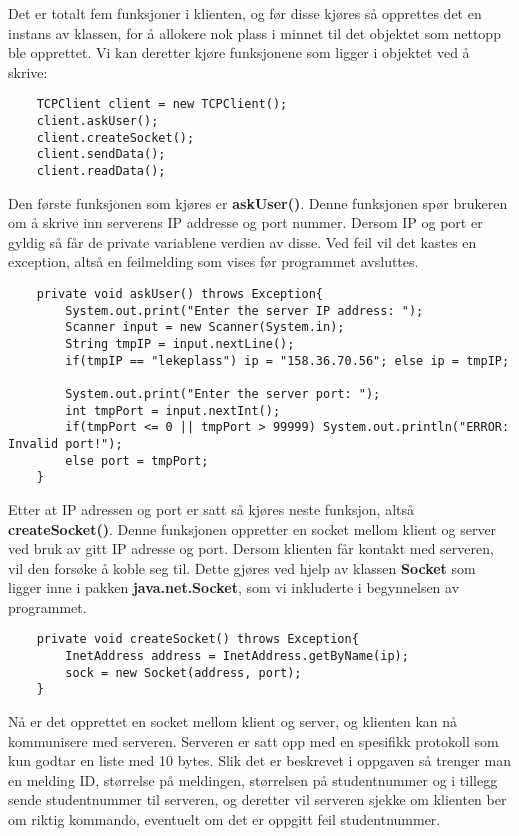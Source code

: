 Det er totalt fem funksjoner i klienten, og før disse kjøres så opprettes det en instans av klassen, for å allokere nok plass i minnet til det objektet som nettopp ble opprettet. Vi kan deretter kjøre funksjonene som ligger i objektet ved å skrive:
\begin{lstlisting}
	TCPClient client = new TCPClient();
	client.askUser();
	client.createSocket();
	client.sendData();
	client.readData();
\end{lstlisting}

Den første funksjonen som kjøres er \textbf{askUser()}. Denne funksjonen spør brukeren om å skrive inn serverens IP addresse og port nummer. Dersom IP og port er gyldig så får de private variablene verdien av disse. Ved feil vil det kastes en exception, altså en feilmelding som vises før programmet avsluttes.
\begin{lstlisting}
	private void askUser() throws Exception{
		System.out.print("Enter the server IP address: ");
		Scanner input = new Scanner(System.in);
		String tmpIP = input.nextLine();
		if(tmpIP == "lekeplass") ip = "158.36.70.56"; else ip = tmpIP;

		System.out.print("Enter the server port: ");
		int tmpPort = input.nextInt();
		if(tmpPort <= 0 || tmpPort > 99999) System.out.println("ERROR: Invalid port!");
		else port = tmpPort;
	}
\end{lstlisting}

Etter at IP adressen og port er satt så kjøres neste funksjon, altså \textbf{createSocket()}. Denne funksjonen oppretter en socket mellom klient og server ved bruk av gitt IP adresse og port. Dersom klienten får kontakt med serveren, vil den forsøke å koble seg til. Dette gjøres ved hjelp av klassen \textbf{Socket} som ligger inne i pakken \textbf{java.net.Socket}, som vi inkluderte i begynnelsen av programmet.
\begin{lstlisting}
	private void createSocket() throws Exception{
		InetAddress address = InetAddress.getByName(ip);
		sock = new Socket(address, port);
	}
\end{lstlisting}

Nå er det opprettet en socket mellom klient og server, og klienten kan nå kommunisere med serveren. Serveren er satt opp med en spesifikk protokoll som kun godtar en liste med 10 bytes. Slik det er beskrevet i oppgaven så trenger man en melding ID, størrelse på meldingen, størrelsen på studentnummer og i tillegg sende studentnummer til serveren, og deretter vil serveren sjekke om klienten ber om riktig kommando, eventuelt om det er oppgitt feil studentnummer.\\

